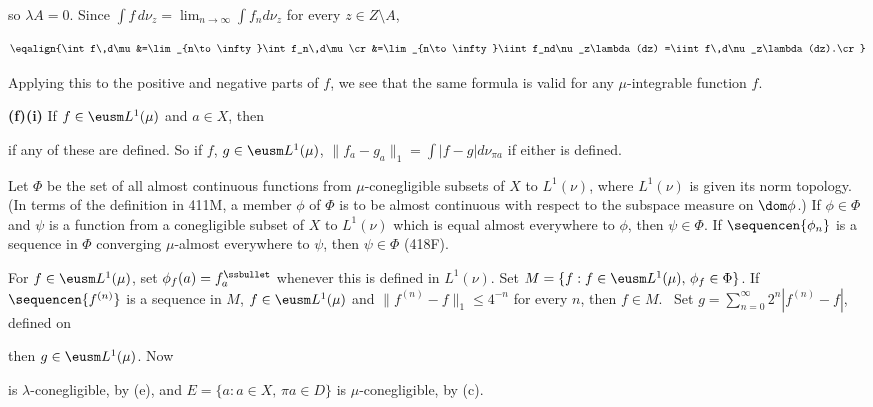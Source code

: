 {

\noindent so $\lambda A=0$.  Since
$\int f\,d\nu_z=\lim_{n\to\infty}\int f_nd\nu_z$ for every
$z\in Z\setminus A$,

$$\eqalign{\int f\,d\mu
&=\lim_{n\to\infty}\int f_n\,d\mu\cr
&=\lim_{n\to\infty}\iint f_nd\nu_z\lambda(dz)
=\iint f\,d\nu_z\lambda(dz).\cr}$$

\noindent Applying this to the positive and negative parts of $f$, we
see that the same formula is valid for any $\mu$-integrable function
$f$.

\medskip

{\bf (f)(i)} If $f\in\eusm L^1(\mu)$ and $a\in X$, then


\noindent if any of these are defined.   So if $f$,
$g\in\eusm L^1(\mu)$, $\|f_a-g_a\|_1=\int|f-g|d\nu_{\pi a}$ if either is
defined.

\medskip

 Let $\Phi$ be the set of all almost continuous functions
from $\mu$-conegligible subsets of $X$ to $L^1(\nu)$, where $L^1(\nu)$
is given its norm topology.   (In terms of the
definition in 411M, a member $\phi$ of $\Phi$ is to be almost continuous
with respect to the subspace measure on $\dom\phi$.)   If $\phi\in\Phi$
and $\psi$ is a function from a conegligible subset of $X$ to $L^1(\nu)$
which is equal almost everywhere to $\phi$, then $\psi\in\Phi$.   If
$\sequencen{\phi_n}$ is a sequence in $\Phi$ converging $\mu$-almost
everywhere to $\psi$, then $\psi\in\Phi$ (418F).

\medskip

 For $f\in\eusm L^1(\mu)$, set
$\phi_f(a)=f_a^{\ssbullet}$ whenever this is defined in $L^1(\nu)$.
Set $M=\{f:f\in\eusm L^1(\mu),\,\phi_f\in\Phi\}$.   If
$\sequencen{f^{(n)}}$ is a sequence in $M$, $f\in\eusm L^1(\mu)$ and
$\|f^{(n)}-f\|_1\le 4^{-n}$ for every $n$, then $f\in M$.   \Prf\ Set
$g=\sum_{n=0}^{\infty}2^n|f^{(n)}-f|$, defined on


\noindent then $g\in\eusm L^1(\mu)$.   Now


\noindent is $\lambda$-conegligible, by (e), and
$E=\{a:a\in X,\,\pi a\in D\}$ is $\mu$-conegligible, by (c).

}
